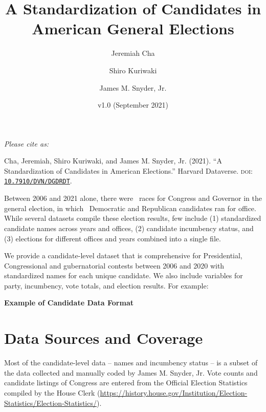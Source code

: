 \documentclass[12pt]{article}
\title{\large\textbf{A Standardization of Candidates in American General Elections}}
\author[1]{\normalsize Jeremiah Cha}
\author[2]{\normalsize Shiro Kuriwaki}
\author[1]{\normalsize James M. Snyder, Jr.}
\affil[1]{\footnotesize Department of Government, Harvard University.}
\affil[2]{\footnotesize Department of Political Science, Stanford University}
\date{\normalsize v1.0 (September 2021)}
\begin{document}
\maketitle 

\begin{center}
\begin{minipage}{0.85\linewidth}
\emph{Please cite as: }

Cha, Jeremiah, Shiro Kuriwaki, and James M. Snyder, Jr. (2021). ``A Standardization of Candidates in American Elections.'' Harvard Dataverse. \textsc{doi}: \href{https://doi.org/10.7910/DVN/DGDRDT}{\texttt{10.7910/DVN/DGDRDT}}.
\end{minipage}
\end{center}
\smallskip

Between 2006 and 2021 alone, there were \unskip \ races for Congress and Governor in the general election, in which \unskip \ Democratic and Republican candidates ran for office.  
While several datasets compile these election results, few include (1) standardized candidate names across years and offices, (2) candidate incumbency status, and (3) elections for different offices and years combined into a single file.


We provide a candidate-level dataset that is comprehensive for Presidential, Congressional and gubernatorial contests between 2006 and 2020 with standardized names for each unique candidate. We also include variables for party, incumbency, vote totals, and election results. For example:

\begin{table}[!h]
\caption{\textbf{Example of Candidate Data Format} \label{tab:cdataexample}}
\centering
\footnotesize

\end{table}

\newpage

\section{Data Sources and Coverage}

Most of the candidate-level data -- names and incumbency status -- is a subset of the data collected and manually coded by James M. Snyder, Jr. Vote counts and candidate listings of Congress are entered from the Official Election Statistics compiled by the House Clerk (\url{https://history.house.gov/Institution/Election-Statistics/Election-Statistics/}).  
\end{document}

